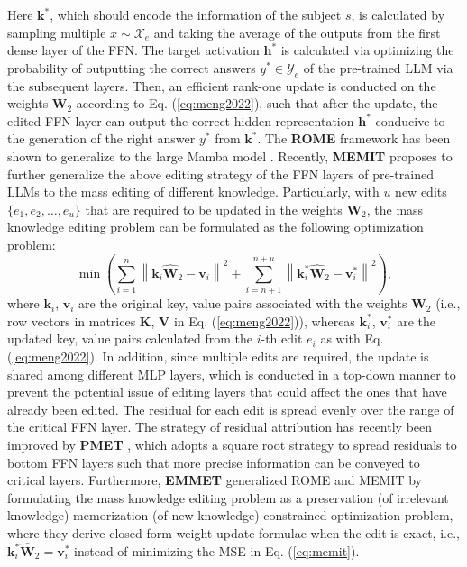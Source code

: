 \documentclass[acmsmall, screen]{acmart}
\begin{document}
Here $\textbf{k}^{*}$, which should encode the information of the subject $s$, is calculated by sampling multiple $x \sim \mathcal{X}_{e}$ and taking the average of the outputs from the first dense layer of the FFN. The target activation $\textbf{h}^{*}$ is calculated via optimizing the probability of outputting the correct answers $y^{*} \in \mathcal{Y}_{e}$ of the pre-trained LLM via the subsequent layers. Then, an efficient rank-one update is conducted on the weights $\textbf{W}_{2}$ according to Eq. (\ref{eq:meng2022}), such that after the update, the edited FFN layer can output the correct hidden representation $\textbf{h}^{*}$ conducive to the generation of the right answer $y^{*}$ from $\textbf{k}^{*}$. {The \textbf{ROME} framework has been shown to generalize to the large Mamba model \cite{sharma2024locating}}. Recently, \textbf{MEMIT} \cite{meng2023mass} proposes to further generalize the above editing strategy of the FFN layers of pre-trained LLMs to the mass editing of different knowledge. Particularly, with $u$ new edits $\{e_{1}, e_{2},\dotsc, e_{u}\}$ that are required to be updated in the weights $\textbf{W}_{2}$, the mass knowledge editing problem can be formulated as the following optimization problem:
\begin{equation}
\label{eq:memit}
\min \left(\sum_{i=1}^n\left\|\textbf{k}_i \hat{\textbf{W}}_{2} -\textbf{v}_i\right\|^2+\sum_{i=n+1}^{n+u}\left\|\textbf{k}^{*}_i \hat{\textbf{W}}_
{2} -\textbf{v}^{*}_i\right\|^2\right),
\end{equation}
where $\textbf{k}_{i}$, $\textbf{v}_{i}$ are the original key, value pairs associated with the weights $\textbf{W}_{2}$ (i.e., row vectors in matrices $\textbf{K}$, $\textbf{V}$ in Eq. (\ref{eq:meng2022})), whereas $\textbf{k}_{i}^{*}$, $\textbf{v}^{*}_{i}$ are the updated key, value pairs calculated from the $i$-th edit $e_{i}$ as with Eq. (\ref{eq:meng2022}). In addition, since multiple edits are required, the update is shared among different MLP layers, which is conducted in a top-down manner to prevent the potential issue of editing layers that could affect the ones that have already been edited. 
The residual for each edit is spread evenly over the range of the critical FFN layer. The strategy of residual attribution has recently been improved by \textbf{PMET} \cite{li2023pmet}, which adopts a square root strategy to spread residuals to bottom FFN layers such that more precise information can be conveyed to critical layers. {Furthermore, \textbf{EMMET} \cite{gupta2024unified} generalized ROME and MEMIT by formulating the mass knowledge editing problem as a preservation (of irrelevant knowledge)-memorization (of new knowledge) constrained optimization problem, where they derive closed form weight update formulae when the edit is exact, i.e., $\textbf{k}^{*}_i \hat{\textbf{W}}_
{2} = \textbf{v}^{*}_i$ instead of minimizing the MSE in Eq. (\ref{eq:memit}).}
\end{document}
